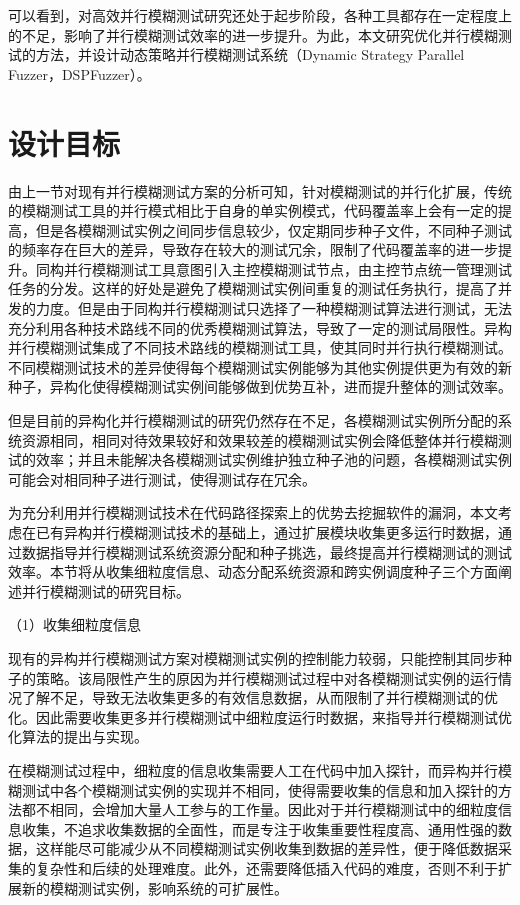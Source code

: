 \documentclass[master]{thesis-uestc}
\begin{document}
可以看到，对高效并行模糊测试研究还处于起步阶段，各种工具都存在一定程度上的不足，影响了并行模糊测试效率的进一步提升。为此，本文研究优化并行模糊测试的方法，并设计动态策略并行模糊测试系统（Dynamic Strategy Parallel Fuzzer，DSPFuzzer）。

\section{设计目标}
由上一节对现有并行模糊测试方案的分析可知，针对模糊测试的并行化扩展，传统的模糊测试工具的并行模式相比于自身的单实例模式，代码覆盖率上会有一定的提高，但是各模糊测试实例之间同步信息较少，仅定期同步种子文件，不同种子测试的频率存在巨大的差异，导致存在较大的测试冗余，限制了代码覆盖率的进一步提升。同构并行模糊测试工具意图引入主控模糊测试节点，由主控节点统一管理测试任务的分发。这样的好处是避免了模糊测试实例间重复的测试任务执行，提高了并发的力度。但是由于同构并行模糊测试只选择了一种模糊测试算法进行测试，无法充分利用各种技术路线不同的优秀模糊测试算法，导致了一定的测试局限性。异构并行模糊测试集成了不同技术路线的模糊测试工具，使其同时并行执行模糊测试。不同模糊测试技术的差异使得每个模糊测试实例能够为其他实例提供更为有效的新种子，异构化使得模糊测试实例间能够做到优势互补，进而提升整体的测试效率。

但是目前的异构化并行模糊测试的研究仍然存在不足，各模糊测试实例所分配的系统资源相同，相同对待效果较好和效果较差的模糊测试实例会降低整体并行模糊测试的效率；并且未能解决各模糊测试实例维护独立种子池的问题，各模糊测试实例可能会对相同种子进行测试，使得测试存在冗余。

为充分利用并行模糊测试技术在代码路径探索上的优势去挖掘软件的漏洞，本文考虑在已有异构并行模糊测试技术的基础上，通过扩展模块收集更多运行时数据，通过数据指导并行模糊测试系统资源分配和种子挑选，最终提高并行模糊测试的测试效率。本节将从收集细粒度信息、动态分配系统资源和跨实例调度种子三个方面阐述并行模糊测试的研究目标。

（1）收集细粒度信息

现有的异构并行模糊测试方案对模糊测试实例的控制能力较弱，只能控制其同步种子的策略。该局限性产生的原因为并行模糊测试过程中对各模糊测试实例的运行情况了解不足，导致无法收集更多的有效信息数据，从而限制了并行模糊测试的优化。因此需要收集更多并行模糊测试中细粒度运行时数据，来指导并行模糊测试优化算法的提出与实现。

在模糊测试过程中，细粒度的信息收集需要人工在代码中加入探针，而异构并行模糊测试中各个模糊测试实例的实现并不相同，使得需要收集的信息和加入探针的方法都不相同，会增加大量人工参与的工作量。因此对于并行模糊测试中的细粒度信息收集，不追求收集数据的全面性，而是专注于收集重要性程度高、通用性强的数据，这样能尽可能减少从不同模糊测试实例收集到数据的差异性，便于降低数据采集的复杂性和后续的处理难度。此外，还需要降低插入代码的难度，否则不利于扩展新的模糊测试实例，影响系统的可扩展性。
\end{document}
